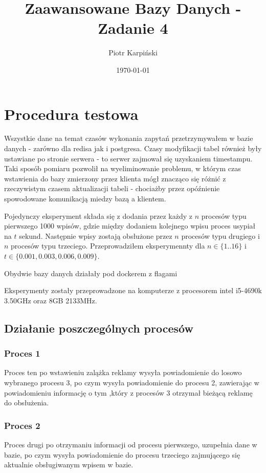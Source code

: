 \documentclass[polish, 10pt]{article}
\author{Piotr Karpiński}
\date{\today}
\title{Zaawansowane Bazy Danych - Zadanie 4}
\begin{document}
\maketitle

\section{Procedura testowa}
Wszystkie dane na temat czasów wykonania zapytań przetrzymywałem w bazie danych - zarówno dla redisa jak i postgresa.  Czasy modyfikacji tabel również były ustawiane po stronie serwera - to serwer zajmował się uzyskaniem timestampu. Taki sposób pomiaru pozwolił na wyeliminowanie problemu, w którym czas wstawienia do bazy zmierzony przez klienta mógł znacząco się różnić z rzeczywistym czasem aktualizacji tabeli - chociażby przez opóźnienie spowodowane komunikacją miedzy bazą a klientem.

Pojedynczy eksperyment składa się z dodania przez każdy z $n$ procesów typu pierwszego 1000 wpisów, gdzie między dodaniem kolejnego wpisu proces usypiał na $t$ sekund. Następnie wpisy zostają obsłużone przez $n$ procesów typu drugiego i $n$ procesów typu trzeciego. Przeprowadziłem eksperymennty dla $n \in \{1..16\}$ i $t \in \{0.001, 0.003, 0.006, 0.009\}$.

Obydwie bazy danych działały pod dockerem z flagami 

Eksperymenty zostały przeprowadzone na komputerze z procesorem intel i5-4690k  3.50GHz oraz 8GB 2133MHz.



\subsection{Działanie poszczególnych procesów}
\subsubsection{Proces 1}
Proces ten po wstawieniu zalążka reklamy wysyła powiadomienie do losowo wybranego procesu 3, po czym wysyła powiadomienie do procesu 2, zawierając w powiadomieniu informację o tym ,który z procesów 3 otrzymał bieżącą reklamę do obsłużenia.

\subsubsection{Proces 2}
Proces drugi po otrzymaniu informacji od procesu pierwszego, uzupełnia dane w bazie, po czym wysyła powiadomienie do procesu trzeciego zajmującego się aktualnie obsługiwanym wpisem w bazie.
\end{document}
